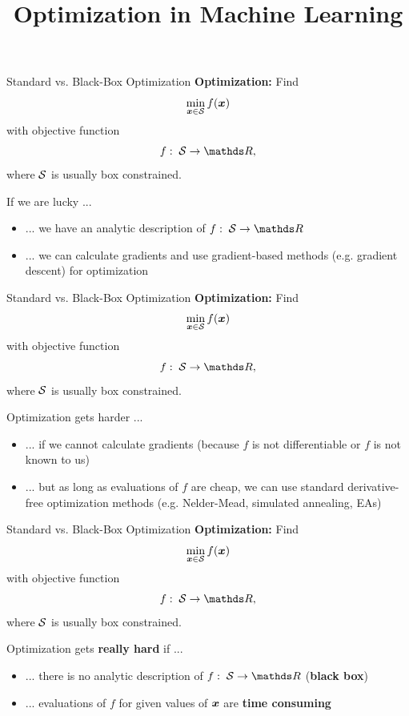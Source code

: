 \documentclass[11pt,compress,t,notes=noshow, xcolor=table]{beamer}
\title{Optimization in Machine Learning}
\begin{document}

\begin{framev}{Standard vs. Black-Box Optimization}
\textbf{Optimization: } Find
$$
\min_{\xv \in \S} \fx
$$
with objective function
$$
f: \; \S \to \R,
$$
where $\S$ is usually box constrained.
\vfill
{}
{
If we are lucky ...
\begin{itemize}
\item ... we have an analytic description of $f: \; \S \to \R$
\item ... we can calculate gradients and use gradient-based methods (e.g. gradient descent) for optimization
\end{itemize}
}
\end{framev}


\begin{framev}{Standard vs. Black-Box Optimization}
\textbf{Optimization: } Find
$$
\min_{\xv \in \S} \fx
$$
with objective function
$$
f: \; \S \to \R,
$$
where $\S$ is usually box constrained.
\vfill
{}
{
Optimization gets harder ...
\begin{itemize}
\item ... if we cannot calculate gradients (because $f$ is not differentiable or $f$ is not known to us)
\item ... but as long as evaluations of $f$ are cheap, we can use standard derivative-free optimization methods (e.g. Nelder-Mead, simulated annealing, EAs)
\end{itemize}
}
\end{framev}


\begin{framev}{Standard vs. Black-Box Optimization}
\textbf{Optimization: } Find
$$
\min_{\xv \in \S} \fx
$$
with objective function
$$
f: \; \S \to \R,
$$
where $\S$ is usually box constrained.
\vfill
\splitVCC[0.4]
{
 
}
{
Optimization gets \textbf{really hard} if ...
\begin{itemize}
\item ... there is no analytic description of $f: \; \S \to \R$ (\textbf{black box})
\item ... evaluations of $f$ for given values of $\xv$ are \textbf{time consuming}
\end{itemize}
}
\end{framev}
\end{document}
